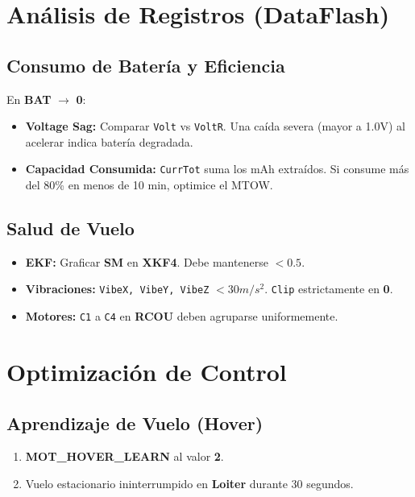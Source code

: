 \documentclass[11pt,a4paper]{article}
\begin{document}
\section{Análisis de Registros (DataFlash)}
\subsection{Consumo de Batería y Eficiencia}
En \textbf{BAT} $\rightarrow$ \textbf{0}:
\begin{itemize}[leftmargin=*,noitemsep]
    \item \textbf{Voltage Sag:} Comparar \texttt{Volt} vs \texttt{VoltR}. Una caída severa (mayor a 1.0V) al acelerar indica batería degradada.
    \item \textbf{Capacidad Consumida:} \texttt{CurrTot} suma los mAh extraídos. Si consume más del 80\% en menos de 10 min, optimice el MTOW.
\end{itemize}

\subsection{Salud de Vuelo}
\begin{itemize}[leftmargin=*,noitemsep]
    \item \textbf{EKF:} Graficar \textbf{SM} en \textbf{XKF4}. Debe mantenerse $< 0.5$.
    \item \textbf{Vibraciones:} \texttt{VibeX, VibeY, VibeZ} $< 30 m/s^2$. \texttt{Clip} estrictamente en \textbf{0}.
    \item \textbf{Motores:} \texttt{C1} a \texttt{C4} en \textbf{RCOU} deben agruparse uniformemente.
\end{itemize}

\section{Optimización de Control}
\subsection{Aprendizaje de Vuelo (Hover)}
\begin{enumerate}[leftmargin=*,noitemsep]
    \item \textbf{MOT\_HOVER\_LEARN} al valor \textbf{2}.
    \item Vuelo estacionario ininterrumpido en \textbf{Loiter} durante 30 segundos.
\end{enumerate}
\end{document}
